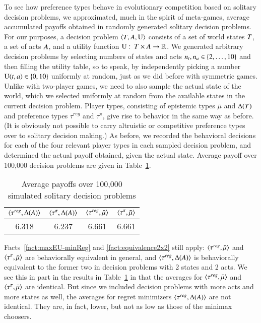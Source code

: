 \documentclass[fleqn,reqno,11pt]{article}
\begin{document}
To see how preference types behave in evolutionary competition based on solitary decision
problems, we approximated, much in the spirit of meta-games, average accumulated payoffs
obtained in randomly generated solitary decision problems. For our purposes, a decision problem
$\left \langle T, A, \operatorname{U}\right\rangle$ consists of a set of world states $T$, a set of acts
$A$, and a utility function $\operatorname{U} \thinspace \colon \thinspace T \times A \rightarrow
\mathbb{R}$.
We generated arbitrary decision problems by selecting numbers of states and acts
$n_t, n_a \in \left\{2, \dots, 10\right\}$ and then filling the utility table, so to speak, by
independently picking a number $\operatorname{U}(t, a) \in \left\{0, 10\right\}$ uniformly at random, just
as we did before with symmetric games. Unlike with two-player games, we need to also sample the
actual state of the world, which we selected uniformly at random from the available states in
the current decision problem. Player types, consisting of epistemic types $\bar{\mu}$ and
$\Delta(T)$ and preference types $\tau^{reg}$ and $\tau^{\pi}$, give rise to behavior in
the same way as before. (It is obviously not possible to carry altruistic or competitive
preference types over to solitary decision making.) As before, we recorded the behavioral
decisions for each of the four relevant player types in each sampled decision problem, and
determined the actual payoff obtained, given the actual state. Average payoff over 100,000 decision
problems are given in Table~\ref{tab:SolitaryDecisions}.

\begin{table}
  \centering
  \begin{tabular}{cccc}
    \toprule
   $\left \langle \tau^{reg}, \Delta(A)\right\rangle$ 
 & $\left \langle \tau^{\pi}, \Delta(A)\right\rangle$ 
 & $\left \langle \tau^{reg}, \bar{\mu}\right\rangle$ 
 & $\left \langle \tau^{\pi}, \bar{\mu}\right\rangle$ 
 \\ \midrule
    6.318 & 6.237 & 6.661 & 6.661 \\ \bottomrule
  \end{tabular}
  \caption{Average payoffs over 100,000 simulated solitary decision problems}
  \label{tab:SolitaryDecisions}
\end{table}

Facts~\ref{fact:maxEU-minReg} and \ref{fact:equivalence2x2} still apply:
$\left \langle \tau^{reg}, \bar{\mu}\right\rangle$ and $\left \langle \tau^{\pi}, \bar{\mu}\right\rangle$ are behaviorally equivalent
in general, and $\left \langle \tau^{reg}, \Delta(A)\right\rangle$ is behaviorally equivalent to the former two in
decision problems with 2 states and 2 acts.  We see this in part in the
results in Table~\ref{tab:SolitaryDecisions} in that the averages for $\left \langle \tau^{reg},
  \bar{\mu}\right\rangle$ and $\left \langle \tau^{\pi}, \bar{\mu}\right\rangle$ are identical. But since we included decision
problems with more acts and more states as well, the averages for regret minimizers
$\left \langle \tau^{reg}, \Delta(A)\right\rangle$ are not identical. They are, in fact, lower, but not as low as
those of the minimax choosers. 
\end{document}
